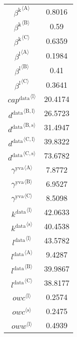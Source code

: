 \begin{tabular}{c|c|}
${\beta^{\mathrm{k}}}^{\langle \mathrm{\mathrm{A}}\rangle}$ & 0.8016 \\
${\beta^{\mathrm{k}}}^{\langle \mathrm{\mathrm{B}}\rangle}$ & 0.59 \\
${\beta^{\mathrm{k}}}^{\langle \mathrm{\mathrm{C}}\rangle}$ & 0.6359 \\
${\beta^{\mathrm{l}}}^{\langle \mathrm{\mathrm{A}}\rangle}$ & 0.1984 \\
${\beta^{\mathrm{l}}}^{\langle \mathrm{\mathrm{B}}\rangle}$ & 0.41 \\
${\beta^{\mathrm{l}}}^{\langle \mathrm{\mathrm{C}}\rangle}$ & 0.3641 \\
${{c\!a\!p}^{\mathrm{data}}}^{\langle \mathrm{\mathrm{l}}\rangle}$ & 20.4174 \\
${d^{\mathrm{data}}}^{\langle \mathrm{\mathrm{B}},\mathrm{\mathrm{l}}\rangle}$ & 26.5723 \\
${d^{\mathrm{data}}}^{\langle \mathrm{\mathrm{B}},\mathrm{\mathrm{s}}\rangle}$ & 31.4947 \\
${d^{\mathrm{data}}}^{\langle \mathrm{\mathrm{C}},\mathrm{\mathrm{l}}\rangle}$ & 39.8322 \\
${d^{\mathrm{data}}}^{\langle \mathrm{\mathrm{C}},\mathrm{\mathrm{s}}\rangle}$ & 73.6782 \\
${\gamma^{\mathrm{yva}}}^{\langle \mathrm{\mathrm{A}}\rangle}$ & 7.8772 \\
${\gamma^{\mathrm{yva}}}^{\langle \mathrm{\mathrm{B}}\rangle}$ & 6.9527 \\
${\gamma^{\mathrm{yva}}}^{\langle \mathrm{\mathrm{C}}\rangle}$ & 8.5098 \\
${k^{\mathrm{data}}}^{\langle \mathrm{\mathrm{l}}\rangle}$ & 42.0633 \\
${k^{\mathrm{data}}}^{\langle \mathrm{\mathrm{s}}\rangle}$ & 40.4538 \\
${l^{\mathrm{data}}}^{\langle \mathrm{\mathrm{l}}\rangle}$ & 43.5782 \\
${l^{\mathrm{data}}}^{\langle \mathrm{\mathrm{A}}\rangle}$ & 9.4287 \\
${l^{\mathrm{data}}}^{\langle \mathrm{\mathrm{B}}\rangle}$ & 39.9867 \\
${l^{\mathrm{data}}}^{\langle \mathrm{\mathrm{C}}\rangle}$ & 38.8177 \\
${{o\!w\!c}}^{\langle \mathrm{\mathrm{l}}\rangle}$ & 0.2574 \\
${{o\!w\!c}}^{\langle \mathrm{\mathrm{s}}\rangle}$ & 0.2475 \\
${{o\!w\!w}}^{\langle \mathrm{\mathrm{l}}\rangle}$ & 0.4939 \\

\end{tabular}
